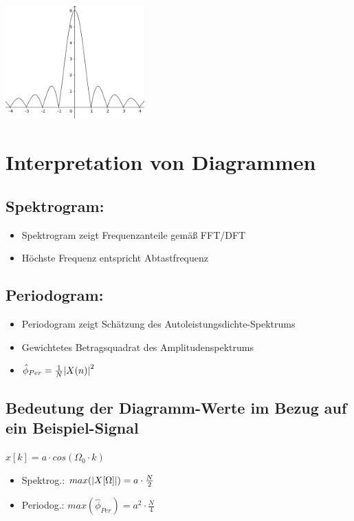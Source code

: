 \documentclass[10pt,a4paper]{article}
\begin{document}
\begin{center}
      \includegraphics[width=0.4\textwidth]{./img/si_funktion.png}
 \end{center}
\begin{minipage}{0.5\textwidth} 
\section{Interpretation von Diagrammen}
\subsection{Spektrogram:}
\begin{itemize}
    \item Spektrogram zeigt Frequenzanteile gemäß FFT/DFT
    \item Höchste Frequenz entspricht Abtastfrequenz
\end{itemize}

\subsection{Periodogram:}  
\begin{itemize}
    \item Periodogram zeigt Schätzung des Autoleistungsdichte-Spektrums 
    \item Gewichtetes Betragsquadrat des Amplitudenspektrums
    \item $\hat{\phi}_{Per} = \frac{1}{N}\abs{X(n)}^2$
\end{itemize}  

\subsection{Bedeutung der Diagramm-Werte im Bezug auf ein Beispiel-Signal}
$x[k] = a\cdot cos(\Omega_{0}\cdot k)$
\begin{itemize}
    \item Spektrog.: $max(\abs{X[\Omega]})= a\cdot\frac{N}{2}$ 
    \item Periodog.: $max(\hat{\phi}_{Per})= a^{2}\cdot\frac{N}{4}$ 
\end{itemize}
\end{minipage}
\end{document}
